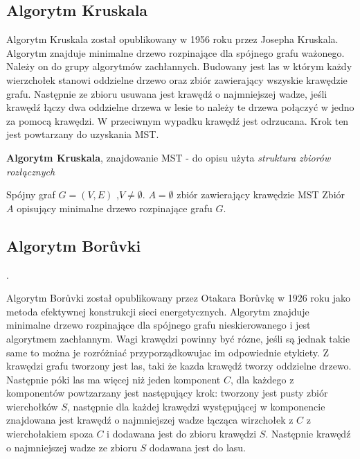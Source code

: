 \documentclass[a4paper, 10pt]{article}
\begin{document}
	
	\subsection{Algorytm Kruskala}
	

Algorytm Kruskala został opublikowany w 1956 roku przez Josepha Kruskala. Algorytm znajduje minimalne drzewo rozpinające dla spójnego grafu ważonego. Należy
on do grupy algorytmów zachłannych. Budowany jest las w którym każdy wierzchołek stanowi oddzielne drzewo oraz zbiór zawierający wszyskie krawędzie grafu.
Następnie ze zbioru usuwana jest krawędź o najmniejszej wadze, jeśli krawędź łączy dwa oddzielne drzewa w lesie	to należy te drzewa połączyć w jedno za pomocą
krawędzi. W przeciwnym wypadku krawędź jest odrzucana. Krok ten jest powtarzany do uzyskania MST.

\begin{algorithm}
\caption{{\bf Algorytm Kruskala}, znajdowanie MST - do opisu użyta \textit{struktura zbiorów rozłącznych}}
\begin{algorithmic}[!h]
\REQUIRE Spójny graf $G=(V,E)$ ,$V \neq \emptyset$. 
\ENSURE $A=\emptyset$ zbiór zawierający krawędzie MST
\ENDFOR 
{}
\ENDIF
\ENDFOR 
\RETURN Zbiór $A$ opisujący minimalne drzewo rozpinające grafu $G$.
\end{algorithmic}
\end{algorithm}
\FloatBarrier



	\subsection{Algorytm Borůvki}.
	

Algorytm Borůvki został opublikowany przez Otakara Borůvkę w 1926 roku jako metoda efektywnej konstrukcji sieci 
energetycznych. Algorytm znajduje minimalne drzewo rozpinające dla spójnego grafu nieskierowanego i jest algorytmem zachłannym.
Wagi krawędzi powinny być rózne, jeśli są jednak takie same to można je rozróżniać przyporządkowujac im odpowiednie etykiety.
Z krawędzi grafu tworzony jest las, taki że kazda krawędź tworzy oddzielne drzewo. Następnie póki las ma więcej niż jeden komponent $C$, dla każdego
z komponentów powtzarzany jest następujący krok: tworzony jest pusty zbiór wierchołków $S$, następnie dla każdej krawędzi występującej w komponencie znajdowana
jest krawędź o najmniejszej wadze łącząca wirzchołek z $C$ z wierchołakiem spoza $C$ i dodawana jest do zbioru krawędzi $S$. Następnie krawędź o najmniejszej wadze ze zbioru
$S$ dodawana jest do lasu.
\end{document}
